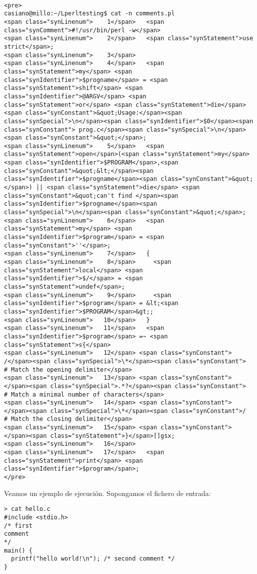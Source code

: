 \begin{verbatim}

<pre>
casiano@millo:~/Lperltesting$ cat -n comments.pl
<span class="synLinenum">    1</span>   <span class="synComment">#!/usr/bin/perl -w</span>
<span class="synLinenum">    2</span>   <span class="synStatement">use strict</span>;
<span class="synLinenum">    3</span> 
<span class="synLinenum">    4</span>   <span class="synStatement">my</span> <span class="synIdentifier">$progname</span> = <span class="synStatement">shift</span> <span class="synIdentifier">@ARGV</span> <span class="synStatement">or</span> <span class="synStatement">die</span> <span class="synConstant">&quot;Usage:</span><span class="synSpecial">\n</span><span class="synIdentifier">$0</span><span class="synConstant"> prog.c</span><span class="synSpecial">\n</span><span class="synConstant">&quot;</span>;
<span class="synLinenum">    5</span>   <span class="synStatement">open</span>(<span class="synStatement">my</span> <span class="synIdentifier">$PROGRAM</span>,<span class="synConstant">&quot;&lt;</span><span class="synIdentifier">$progname</span><span class="synConstant">&quot;</span>) || <span class="synStatement">die</span> <span class="synConstant">&quot;can't find </span><span class="synIdentifier">$progname</span><span class="synSpecial">\n</span><span class="synConstant">&quot;</span>;
<span class="synLinenum">    6</span>   <span class="synStatement">my</span> <span class="synIdentifier">$program</span> = <span class="synConstant">''</span>;
<span class="synLinenum">    7</span>   {
<span class="synLinenum">    8</span>     <span class="synStatement">local</span> <span class="synIdentifier">$/</span> = <span class="synStatement">undef</span>;
<span class="synLinenum">    9</span>     <span class="synIdentifier">$program</span> = &lt;<span class="synIdentifier">$PROGRAM</span>&gt;;
<span class="synLinenum">   10</span>   }
<span class="synLinenum">   11</span>   <span class="synIdentifier">$program</span> =~ <span class="synStatement">s{</span>
<span class="synLinenum">   12</span> <span class="synConstant">    /</span><span class="synSpecial">\*</span><span class="synConstant">  # Match the opening delimiter</span>
<span class="synLinenum">   13</span> <span class="synConstant">    </span><span class="synSpecial">.*?</span><span class="synConstant">  # Match a minimal number of characters</span>
<span class="synLinenum">   14</span> <span class="synConstant">    </span><span class="synSpecial">\*</span><span class="synConstant">/  # Match the closing delimiter</span>
<span class="synLinenum">   15</span> <span class="synConstant">  </span><span class="synStatement">}</span>[]gsx;
<span class="synLinenum">   16</span> 
<span class="synLinenum">   17</span>   <span class="synStatement">print</span> <span class="synIdentifier">$program</span>;
</pre>

\end{verbatim}
Veamos un ejemplo de ejecución. Supongamos el fichero de entrada:
\begin{verbatim}
> cat hello.c
#include <stdio.h>
/* first
comment
*/
main() {
  printf("hello world!\n"); /* second comment */
}
\end{verbatim}


